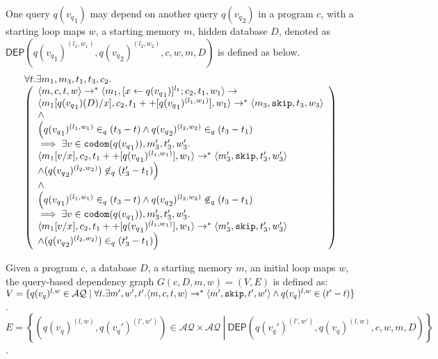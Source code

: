 \begin{defn}
One query $q({v_q}_1)$ may depend on another query $q({v_q}_2)$ in a program $c$, with a starting loop maps $w$, a starting memory $m$, hidden database $D$, denoted as \\
$\mathsf{DEP}(q({v_q}_1)^{(l_1, w_1)}, q({v_q}_2)^{(l_2, w_2)}, c,w, m ,D)$ is defined as below. 
\[
\begin{array}{l}
\forall  t. \exists m_1,m_3,t_1,t_3,c_2.\\
  \left (\begin{array}{l}   
\langle m, c,  t,w \rangle \rightarrow^{*} \langle m_1, [\mathrel{ x \leftarrow q({v_q}_1) }]^{l_1} ; c_2,
  t_1,w_1 \rangle \rightarrow \\ \langle m_1[q({v_q}_1)(D)/x], c_2,
  t_1++[q({v_q}_1)^{(l_1, w_1)}], w_1 \rangle \rightarrow^{*} \langle m_3, \mathtt{skip},
  t_3,w_3 \rangle \\  
  \land \\
\Big( q({v_q}_1)^{(l_1,w_1)} \in_{q} (t_3-t) \land q({v_q}_2)^{(l_2,w_2)} \in_{q} (t_3-t_1) \\ \implies  \exists v \in \mathtt{codom}(q({v_q}_1)), m_3', t_3', w_3'.  \\
 \langle m_1[v/x], {c_2}, t_1++[q({v_q}_1)^{(l_1,w_1)}], w_1 \rangle \rightarrow^{*} \langle m_3', \mathtt{skip}, t_3', w_3' \rangle \\ \land (q({v_q}_2)^{(l_2,w_2)}) \not \in_{q} (t_3'-t_1)
\Big)\\
\land \\
\Big(q({v_q}_1)^{(l_1,w_1)} \in_{q} (t_3-t) \land q({v_q}_2)^{(l_2,w_2)} \not\in_{q} (t_3-t_1) \\ \implies  \exists v \in \mathtt{codom}(q({v_q}_1)),  m_3', t_3', w_3'. \\
 \langle m_1[v/x], {c_2}, t_1++[q({v_q}_1)^{(l_1,w_1)}], w_1 \rangle \rightarrow^{*} \langle m_3', \mathtt{skip}, t_3', w_3' \rangle \\ \land (q({v_q}_2)^{(l_2,w_2)})  \in_{q} (t_3'-t_1)
\Big)
\end{array} \right )
\end{array}
\]
\end{defn}

\begin{defn}
Given a program $c$, a database $D$, a starting memory $m$, an initial loop maps $w$, the query-based dependency graph $G(c,D,m,w) = (V, E)$ is defined as: \\
$V =\{q(v_q)^{l,w} \in \mathcal{AQ} \mid \forall t. \exists m',  w', t'.  \langle m ,c, t, w \rangle  \to^{*}  \langle m' , \mathtt{skip}, t', w'  \rangle  \land q(v_q)^{l,w} \in {(t'-t)}  \}$.
\\
$E = \left\{(q(v_q)^{(l,w)},q(v_q')^{(l',w')}) \in \mathcal{AQ} \times \mathcal{AQ} 
~ \left \vert ~ \mathsf{DEP}(q(v_q')^{(l',w')},q(v_q)^{(l,w)}, c,w,m,D)
 \right.\right\}$.
\end{defn}

